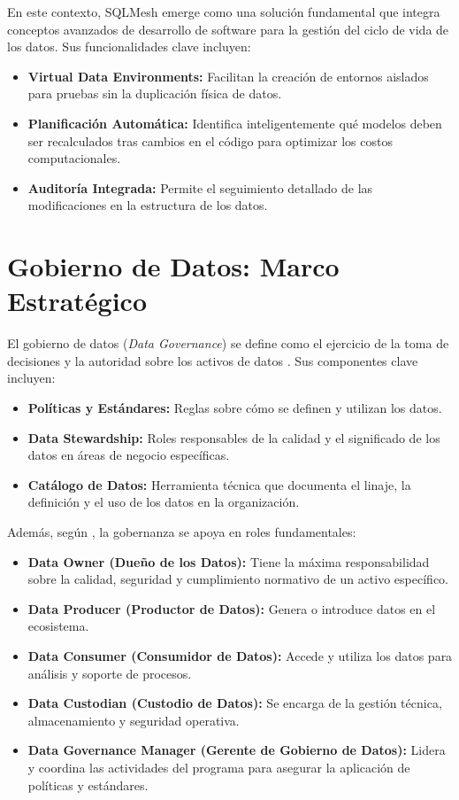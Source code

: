 En este contexto, SQLMesh emerge como una solución fundamental que integra conceptos avanzados de desarrollo de software para la gestión del ciclo de vida de los datos. Sus funcionalidades clave incluyen:

\begin{itemize}
    \item \textbf{Virtual Data Environments:} Facilitan la creación de entornos aislados para pruebas sin la duplicación física de datos.
    \item \textbf{Planificación Automática:} Identifica inteligentemente qué modelos deben ser recalculados tras cambios en el código para optimizar los costos computacionales.
    \item \textbf{Auditoría Integrada:} Permite el seguimiento detallado de las modificaciones en la estructura de los datos.
\end{itemize}

\newpage


\section{Gobierno de Datos: Marco Estratégico}

El gobierno de datos (\textit{Data Governance}) se define como el ejercicio de la toma de decisiones y la autoridad sobre los activos de datos \parencite{ladley2019data}. Sus componentes clave incluyen:

\begin{itemize}
    \item \textbf{Políticas y Estándares:} Reglas sobre cómo se definen y utilizan los datos.
    \item \textbf{Data Stewardship:} Roles responsables de la calidad y el significado de los datos en áreas de negocio específicas.
    \item \textbf{Catálogo de Datos:} Herramienta técnica que documenta el linaje, la definición y el uso de los datos en la organización.
\end{itemize}

Además, según \textcite{ladley2019data}, la gobernanza se apoya en roles fundamentales:

\begin{itemize}
    \item \textbf{Data Owner (Dueño de los Datos):} Tiene la máxima responsabilidad sobre la calidad, seguridad y cumplimiento normativo de un activo específico.
    \item \textbf{Data Producer (Productor de Datos):} Genera o introduce datos en el ecosistema.
    \item \textbf{Data Consumer (Consumidor de Datos):} Accede y utiliza los datos para análisis y soporte de procesos.
    \item \textbf{Data Custodian (Custodio de Datos):} Se encarga de la gestión técnica, almacenamiento y seguridad operativa.
    \item \textbf{Data Governance Manager (Gerente de Gobierno de Datos):} Lidera y coordina las actividades del programa para asegurar la aplicación de políticas y estándares.
\end{itemize}



